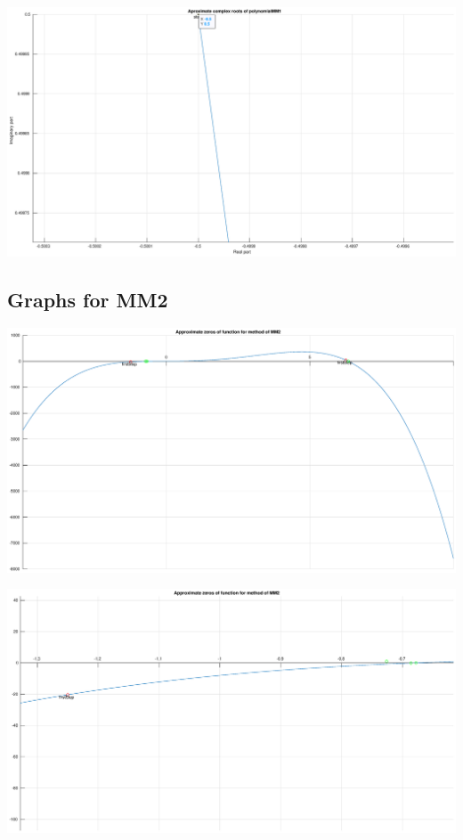 \documentclass[12pt]{report}
\begin{document}
\begin{center}
   \includegraphics[scale=0.25]{task2mm1complexzommedup.eps}
\end{center}

\subsection{Graphs for MM2}
\begin{center}
   \includegraphics[scale=0.25]{task2mm2overall.eps}
\end{center}

\begin{center}
   \includegraphics[scale=0.25]{task2mm2zommedleft.eps}
\end{center}
\end{document}
